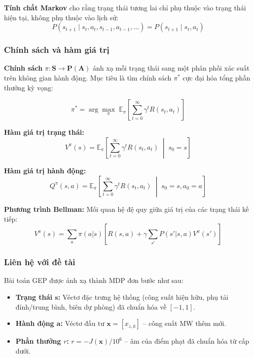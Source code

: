 \noindent \textbf{Tính chất Markov} cho rằng trạng thái tương lai chỉ phụ thuộc vào trạng thái hiện tại, không phụ thuộc vào lịch sử:
\begin{equation}
    P(s_{t+1} \mid s_t, a_t, s_{t-1}, a_{t-1}, \ldots) = P(s_{t+1} \mid s_t, a_t)
\end{equation}

\subsubsection{Chính sách và hàm giá trị}

\textbf{Chính sách} $\pi: \mathbf{S} \to \mathbf{P}(\mathbf{A})$ ánh xạ mỗi trạng thái sang một phân phối xác suất trên không gian hành động. Mục tiêu là tìm chính sách $\pi^*$ cực đại hóa tổng phần thưởng kỳ vọng:

\begin{equation}
    \pi^* = \arg\max_{\pi} \; \mathbb{E}_{\pi}\left[\sum_{t=0}^{\infty} \gamma^t R(s_t, a_t)\right]
    \label{eq:optimal_policy}
\end{equation}

\textbf{Hàm giá trị trạng thái:}
\begin{equation}
    V^{\pi}(s) = \mathbb{E}_{\pi}\left[\sum_{t=0}^{\infty} \gamma^t R(s_t, a_t) \;\middle|\; s_0 = s\right]
    \label{eq:value_function}
\end{equation}

\textbf{Hàm giá trị hành động:}
\begin{equation}
    Q^{\pi}(s, a) = \mathbb{E}_{\pi}\left[\sum_{t=0}^{\infty} \gamma^t R(s_t, a_t) \;\middle|\; s_0 = s, a_0 = a\right]
    \label{eq:q_function}
\end{equation}

\textbf{Phương trình Bellman:} Mối quan hệ đệ quy giữa giá trị của các trạng thái kế tiếp:
\begin{equation}
    V^{\pi}(s) = \sum_{a} \pi(a|s) \left[ R(s,a) + \gamma \sum_{s'} P(s'|s,a) V^{\pi}(s') \right]
    \label{eq:bellman}
\end{equation}

\iffalse
\subsubsection{Liên hệ với đề tài}

Bài toán GEP được ánh xạ thành MDP đơn bước như sau:

\begin{itemize}
    \item \textbf{Trạng thái $\mathbf{s}$:} Véctơ đặc trưng hệ thống (công suất hiện hữu, phụ tải đỉnh/trung bình, biên dự phòng) đã chuẩn hóa về $[-1, 1]$.
    \item \textbf{Hành động $\mathbf{a}$:} Véctơ đầu tư $\mathbf{x} = [x_{z,k}]$ -- công suất MW thêm mới.
    \item \textbf{Phần thưởng $r$:} $r = -J(\mathbf{x})/10^6$ -- âm của điểm phạt đã chuẩn hóa từ cấp dưới.
\end{itemize}


